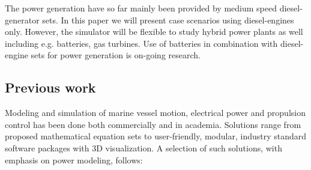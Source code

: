 \documentclass[twocolumn,10pt]{asme2e}
\begin{document}
The power generation have so far mainly been provided by medium speed diesel-generator sets. 
In this paper we will present case scenarios using diesel-engines only. 
However, the simulator will be flexible to study hybrid power plants as well including e.g. batteries, gas turbines. 
Use of batteries in combination with diesel-engine sets for power generation is on-going research.  

\subsection*{Previous work}
Modeling and simulation of marine vessel motion, electrical power
and propulsion control has been done both commercially and in academia.
Solutions range from proposed mathematical equation sets to user-friendly,
modular, industry standard software packages with 3D visualization.
A selection of such solutions, with emphasis
on power modeling, follows:
\end{document}
